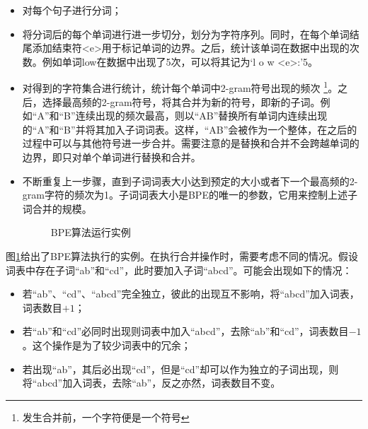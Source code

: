 \begin{itemize}
\vspace{0.5em}
\item 对每个句子进行分词；
\vspace{0.5em}
\item 将分词后的每个单词进行进一步切分，划分为字符序列。同时，在每个单词结尾添加结束符<e>用于标记单词的边界。之后，统计该单词在数据中出现的次数。例如单词low在数据中出现了5次，可以将其记为`l o w <e>:'5。
\vspace{0.5em}
\item 对得到的字符集合进行统计，统计每个单词中2-gram符号出现的频次 \footnote{发生合并前，一个字符便是一个符号}。之后，选择最高频的2-gram符号，将其合并为新的符号，即新的子词。例如``A''和``B''连续出现的频次最高，则以``AB''替换所有单词内连续出现的``A''和``B''并将其加入子词词表。这样，``AB''会被作为一个整体，在之后的过程中可以与其他符号进一步合并。需要注意的是替换和合并不会跨越单词的边界，即只对单个单词进行替换和合并。
\vspace{0.5em}
\item 不断重复上一步骤，直到子词词表大小达到预定的大小或者下一个最高频的2-gram字符的频次为1。子词词表大小是BPE的唯一的参数，它用来控制上述子词合并的规模。
\vspace{0.5em}

\begin{figure}[htp]
\centering

\caption{BPE算法运行实例}
\label{fig:7-9}
\end{figure}
\end{itemize}

\parinterval 图\ref{fig:7-9}给出了BPE算法执行的实例。在执行合并操作时，需要考虑不同的情况。假设词表中存在子词``ab''和``cd''，此时要加入子词``abcd''。可能会出现如下的情况：

\begin{itemize}
\item 若``ab''、``cd''、``abcd''完全独立，彼此的出现互不影响，将``abcd''加入词表，词表数目$+1$；

\item 若``ab''和``cd''必同时出现则词表中加入``abcd''，去除``ab''和``cd''，词表数目$-1$。这个操作是为了较少词表中的冗余；

\item 若出现``ab''，其后必出现``cd''，但是``cd''却可以作为独立的子词出现，则将``abcd''加入词表，去除``ab''，反之亦然，词表数目不变。
\end{itemize}

